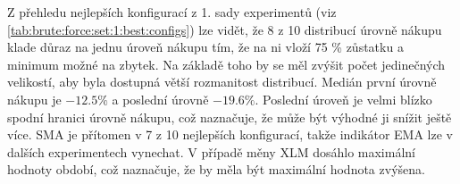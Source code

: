 Z přehledu nejlepších konfigurací z 1. sady experimentů (viz \ref{tab:brute:force:set:1:best:configs}) lze vidět, že 8 z 10 distribucí úrovně nákupu klade důraz na jednu úroveň nákupu tím, že na ni vloží 75 \% zůstatku a minimum možné na zbytek.
Na základě toho by se měl zvýšit počet jedinečných velikostí, aby byla dostupná větší rozmanitost distribucí.
Medián první úrovně nákupu je \(-12.5 \% \) a poslední úrovně \( -19.6 \% \). 
Poslední úroveň je velmi blízko spodní hranici úrovně nákupu, což naznačuje, že může být výhodné ji snížit ještě více.
SMA je přítomen v 7 z 10 nejlepších konfigurací, takže indikátor EMA lze v dalších experimentech vynechat.
V případě měny XLM dosáhlo maximální hodnoty období, což naznačuje, že by měla být maximální hodnota zvýšena.

